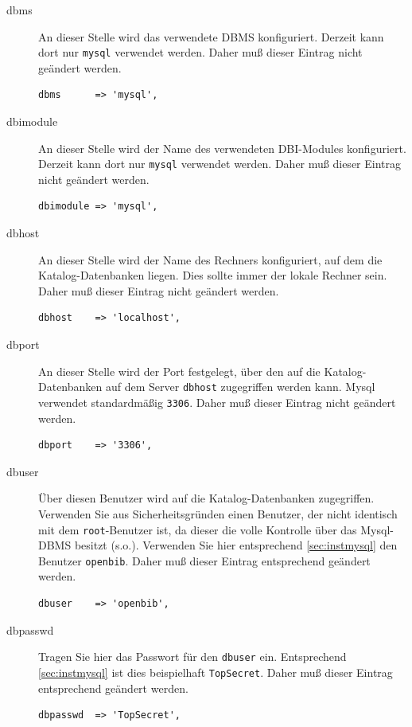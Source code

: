 \documentclass[11pt, twoside, a4paper, BCOR8mm, DIV12, bibtotoc,idxtotoc]{scrbook}
\begin{document}
\begin{description}
\item[dbms] An dieser Stelle wird das verwendete DBMS
  konfiguriert. Derzeit kann dort nur \texttt{mysql} verwendet
  werden. Daher muß dieser Eintrag nicht geändert werden.
\begin{verbatim}
dbms      => 'mysql',
\end{verbatim}

\item[dbimodule] An dieser Stelle wird der Name des verwendeten
  DBI-Modules konfiguriert. Derzeit kann dort nur \texttt{mysql}
  verwendet werden. Daher muß dieser Eintrag nicht geändert werden.
\begin{verbatim}
dbimodule => 'mysql',
\end{verbatim}
\item[dbhost] An dieser Stelle wird der Name des Rechners
  konfiguriert, auf dem die Katalog-Datenbanken liegen. Dies sollte
  immer der lokale Rechner sein. Daher muß dieser Eintrag nicht
  geändert werden.
\begin{verbatim}
dbhost    => 'localhost',
\end{verbatim}
\item[dbport] An dieser Stelle wird der Port festgelegt, über den auf
  die Katalog-Datenbanken auf dem Server \texttt{dbhost} zugegriffen
  werden kann. Mysql verwendet standardmäßig \texttt{3306}. Daher
  muß dieser Eintrag nicht geändert werden.
\begin{verbatim}
dbport    => '3306',
\end{verbatim}
\item[dbuser] Über diesen Benutzer wird auf die Katalog-Datenbanken
  zugegriffen. Verwenden Sie aus Sicherheitsgründen einen Benutzer,
  der nicht identisch mit dem \texttt{root}-Benutzer ist, da dieser
  die volle Kontrolle über das Mysql-DBMS besitzt (s.o.). Verwenden
  Sie hier entsprechend \ref{sec:instmysql} den Benutzer
  \texttt{openbib}. Daher muß dieser Eintrag entsprechend geändert
  werden.
\begin{verbatim}
dbuser    => 'openbib',
\end{verbatim}
\item[dbpasswd] Tragen Sie hier das Passwort für den \texttt{dbuser}
  ein. Entsprechend \ref{sec:instmysql} ist dies beispielhaft
  \texttt{TopSecret}. Daher muß dieser Eintrag entsprechend geändert
  werden.
\begin{verbatim}
dbpasswd  => 'TopSecret',
\end{verbatim}
\end{description}
\end{document}

